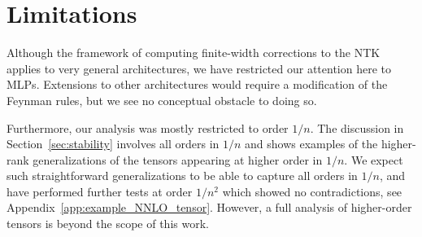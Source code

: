 \section{Limitations}\label{sec:conclusion}

Although the framework of computing finite-width corrections to the NTK applies to very general architectures, we have restricted our attention here to MLPs. Extensions to other architectures would require a modification of the Feynman rules, but we see no conceptual obstacle to doing so.

Furthermore, our analysis was mostly restricted to order $1/n$. The discussion in Section~\ref{sec:stability} involves all orders in $1/n$ and shows examples of the higher-rank generalizations of the tensors appearing at higher order in $1/n$. We expect such straightforward generalizations to be able to capture all orders in $1/n$, and have performed further tests at order $1/n^{2}$ which showed no contradictions, see Appendix~\ref{app:example_NNLO_tensor}. However, a full analysis of higher-order tensors is beyond the scope of this work.

